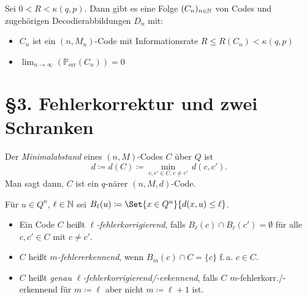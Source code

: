 \documentclass{cheat-sheet}
\renewcommand{\P}{\mathbb{P}} %
\newcommand{\err}{\text{err}} %
\begin{document}
\begin{samepage}

\begin{satz}
  Sei $0 < R < \kappa(q, p)$.
  Dann gibt es eine Folge $(C_n)_{n \in \mathbb{N}}$ von Codes und zugehörigen Decodierabbildungen $D_n$ mit: %
  \begin{itemize}
    \item $C_n$ ist ein $(n, M_n)$-Code mit Informationsrate $R \!\leq\! R(C_n) \!<\! \kappa(q, p)$
    \item $\lim_{n \to \infty} \left( \P_\err(C_n) \right) = 0$
  \end{itemize}
\end{satz}

\section{§3. Fehlerkorrektur und zwei Schranken}

\end{samepage}


\begin{defn}
  Der \emph{Minimalabstand} eines $(n, M)$-Codes $C$ über $Q$ ist
  \[ d \coloneqq d(C) \coloneqq {\min}_{c,c' \in C, c \neq c'} \, d(c,c'). \]
  Man sagt dann, $C$ ist ein $q$-närer $(n, M, d)$-Code.
\end{defn}

\begin{nota}
  Für $u \in Q^n$, $\ell \in \mathbb{N}$ sei $B_\ell(u) \coloneqq \Set{x \in Q^n}{d(x, u) \leq \ell}$.
\end{nota}

\begin{defn}
  \begin{itemize}
    \item Ein Code $C$ heißt \emph{$\ell$-fehlerkorrigierend}, falls $B_\ell(c) \cap B_\ell(c') = \emptyset$ für alle $c, c' \in C$ mit $c \neq c'$.
    \item $C$ heißt \emph{$m$-fehlererkennend}, wenn $B_m(c) \cap C = \{ c \}$ f.\,a. $c \in C$.
    \item $C$ heißt \emph{genau $\ell$-fehlerkorrigierend/-erkennend}, falls $C$ $m$-fehlerkorr./-erkennend für $m \coloneqq \ell$ aber nicht $m \coloneqq \ell+1$ ist.
  \end{itemize}
\end{defn}
\end{document}
